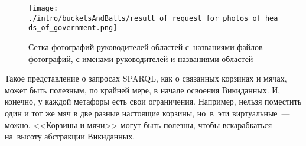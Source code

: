 \begin{figure*}[h!]
\texttt{[image: ./intro/bucketsAndBalls/result\_of\_request\_for\_photos\_of\_heads\_of\_government.png]}
    \caption[Сетка фотографий руководителей областей.]
    {Сетка фотографий руководителей областей 
        с~названиями файлов\\фотографий, 
        с именами руководителей 
        и названиями областей}
    \label{fig:Result_of_the_request}
\end{figure*}

Такое представление о запросах SPARQL, как о связанных корзинах и мячах, может быть полезным, 
по крайней мере, в начале освоения Викиданных. 
И, конечно, у каждой метафоры есть свои ограничения. 
Например, нельзя поместить один и тот же мяч в две разные настоящие корзины, 
но~в~эти виртуальные~--- можно. 
<<Корзины и мячи>> могут быть полезны, чтобы вскарабкаться на~высоту абстракции Викиданных.
